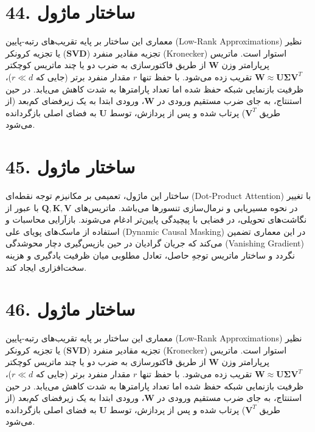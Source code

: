 \documentclass[12pt,a4paper]{report}
\begin{document}
\section*{44. ساختار ماژول }
معماری این ساختار بر پایه تقریب‌های رتبه-پایین (Low-Rank Approximations) نظیر تجزیه مقادیر منفرد ($\mathbf{SVD}$) یا تجزیه کرونکر (Kronecker) استوار است. ماتریس پرپارامتر وزن $\mathbf{W}$ از طریق فاکتورسازی به ضرب دو یا چند ماتریس کوچکتر $\mathbf{W} \approx \mathbf{U} \mathbf{\Sigma} \mathbf{V}^T$ تقریب زده می‌شود. با حفظ تنها $r$ مقدار منفرد برتر (جایی که $r \ll d$)، ظرفیت بازنمایی شبکه حفظ شده اما تعداد پارامترها به شدت کاهش می‌یابد. در حین استنتاج، به جای ضرب مستقیم ورودی در $\mathbf{W}$، ورودی ابتدا به یک زیرفضای کم‌بعد (از طریق $\mathbf{V}^T$) پرتاب شده و پس از پردازش، توسط $\mathbf{U}$ به فضای اصلی بازگردانده می‌شود.

\section*{45. ساختار ماژول }
ساختار این ماژول، تعمیمی بر مکانیزم توجه نقطه‌ای (Dot-Product Attention) با تغییر در نحوه مسیریابی و نرمال‌سازی تنسورها می‌باشد. ماتریس‌های $\mathbf{Q, K, V}$ با عبور از نگاشت‌های تحویلی، در فضایی با پیچیدگی پایین‌تر ادغام می‌شوند. بازآرایی محاسبات و استفاده از ماسک‌های پویای علی (Dynamic Causal Masking) در این معماری تضمین می‌کند که جریان گرادیان در حین بازپس‌گیری دچار محوشدگی (Vanishing Gradient) نگردد و ساختار ماتریس توجهِ حاصل، تعادل مطلوبی میان ظرفیت یادگیری و هزینه سخت‌افزاری ایجاد کند.

\section*{46. ساختار ماژول }
معماری این ساختار بر پایه تقریب‌های رتبه-پایین (Low-Rank Approximations) نظیر تجزیه مقادیر منفرد ($\mathbf{SVD}$) یا تجزیه کرونکر (Kronecker) استوار است. ماتریس پرپارامتر وزن $\mathbf{W}$ از طریق فاکتورسازی به ضرب دو یا چند ماتریس کوچکتر $\mathbf{W} \approx \mathbf{U} \mathbf{\Sigma} \mathbf{V}^T$ تقریب زده می‌شود. با حفظ تنها $r$ مقدار منفرد برتر (جایی که $r \ll d$)، ظرفیت بازنمایی شبکه حفظ شده اما تعداد پارامترها به شدت کاهش می‌یابد. در حین استنتاج، به جای ضرب مستقیم ورودی در $\mathbf{W}$، ورودی ابتدا به یک زیرفضای کم‌بعد (از طریق $\mathbf{V}^T$) پرتاب شده و پس از پردازش، توسط $\mathbf{U}$ به فضای اصلی بازگردانده می‌شود.
\end{document}
